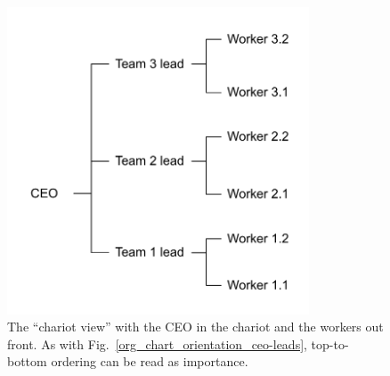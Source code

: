 \begin{figure}
\includegraphics[width=0.8\textwidth]{images/org-chart-orientation-workers-lead.pdf}
\caption{The ``chariot view'' with the CEO in the chariot and the workers out front. As with Fig.~\ref{org_chart_orientation_ceo-leads}, top-to-bottom ordering can be read as importance. }
\label{org_chart_orientation_ceo-follows}
\end{figure}
